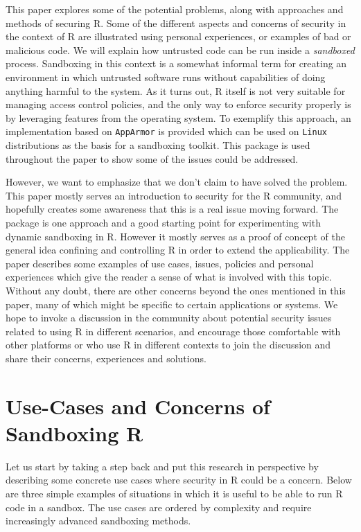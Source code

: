 \documentclass[article]{jss}
\newcommand{\R}{\textsf{R}\xspace}
\newcommand{\AppArmor}{\texttt{AppArmor}\xspace}
\newcommand{\RAppArmor}{\pkg{RAppArmor}\xspace}
\newcommand{\Linux}{\texttt{Linux}\xspace}
\begin{document}
This paper explores some of the potential problems, along with approaches and
methods of securing \R. Some of the different aspects and concerns of
security in the context of \R are illustrated using personal
experiences, or examples of bad or malicious code. We will explain how untrusted
code can be run inside a \emph{sandboxed} process. Sandboxing in
this context is a somewhat informal term for creating an environment in which
untrusted software runs without capabilities of doing anything harmful to the
system. As it turns out, \R itself is not very suitable for managing
access control policies, and the only way to enforce security properly is by
leveraging features from the operating system. To exemplify this approach, an
implementation based on \AppArmor is provided which can be
used on \Linux distributions as the basis for a sandboxing toolkit. This package
is used throughout the paper to show some of the issues could be addressed.

However, we want to emphasize that we don't claim to have solved the problem.
This paper mostly serves an introduction to security for the \R
community, and hopefully creates some awareness that this is a real issue moving
forward. The \RAppArmor package is one approach and a good starting point
for experimenting with dynamic sandboxing in \R. However it mostly
serves as a proof of concept of the general idea confining and controlling \R
in order to extend the applicability. The paper describes some examples of use
cases, issues, policies and personal experiences which give the reader a sense
of what is involved with this topic. Without any doubt, there are other concerns
beyond the ones mentioned in this paper, many of which might be specific to
certain applications or systems. We hope to invoke a discussion in the community
about potential security issues related to using \R in
different scenarios, and encourage those comfortable with other platforms or who
use \R in different contexts to join the discussion and share their
concerns, experiences and solutions.

\section{Use-Cases and Concerns of Sandboxing R}

Let us start by taking a step back and put this research in perspective by
describing some concrete use cases where security in \R could be a
concern. Below are three simple examples of situations in which it is useful to
be able to run \R code in a sandbox. The use cases are ordered by
complexity and require increasingly advanced sandboxing methods.
\end{document}
